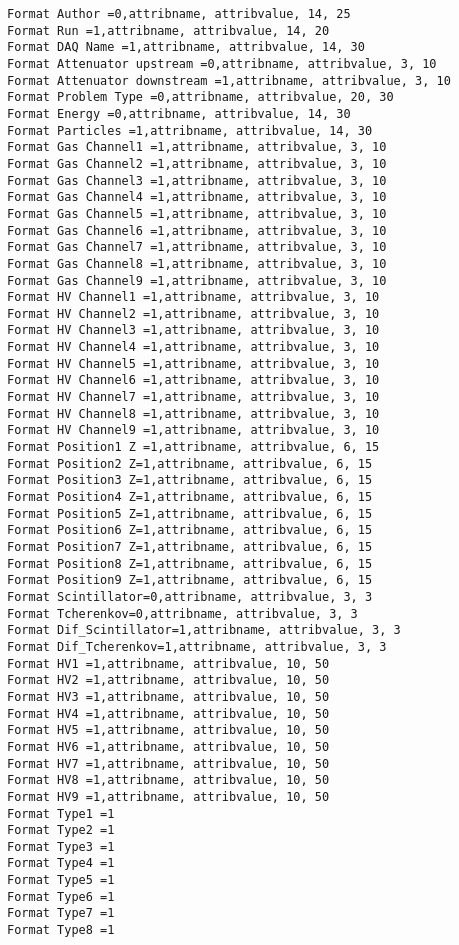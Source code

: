 {\begin{lstlisting}[breaklines=true,basicstyle=\tiny,postbreak=\mbox{\textcolor{red}{$\hookrightarrow$}\space},]
Format Author =0,attribname, attribvalue, 14, 25
Format Run =1,attribname, attribvalue, 14, 20
Format DAQ Name =1,attribname, attribvalue, 14, 30
Format Attenuator upstream =0,attribname, attribvalue, 3, 10
Format Attenuator downstream =1,attribname, attribvalue, 3, 10
Format Problem Type =0,attribname, attribvalue, 20, 30
Format Energy =0,attribname, attribvalue, 14, 30
Format Particles =1,attribname, attribvalue, 14, 30
Format Gas Channel1 =1,attribname, attribvalue, 3, 10
Format Gas Channel2 =1,attribname, attribvalue, 3, 10
Format Gas Channel3 =1,attribname, attribvalue, 3, 10
Format Gas Channel4 =1,attribname, attribvalue, 3, 10
Format Gas Channel5 =1,attribname, attribvalue, 3, 10
Format Gas Channel6 =1,attribname, attribvalue, 3, 10
Format Gas Channel7 =1,attribname, attribvalue, 3, 10
Format Gas Channel8 =1,attribname, attribvalue, 3, 10
Format Gas Channel9 =1,attribname, attribvalue, 3, 10
Format HV Channel1 =1,attribname, attribvalue, 3, 10
Format HV Channel2 =1,attribname, attribvalue, 3, 10
Format HV Channel3 =1,attribname, attribvalue, 3, 10
Format HV Channel4 =1,attribname, attribvalue, 3, 10
Format HV Channel5 =1,attribname, attribvalue, 3, 10
Format HV Channel6 =1,attribname, attribvalue, 3, 10
Format HV Channel7 =1,attribname, attribvalue, 3, 10
Format HV Channel8 =1,attribname, attribvalue, 3, 10
Format HV Channel9 =1,attribname, attribvalue, 3, 10
Format Position1 Z =1,attribname, attribvalue, 6, 15
Format Position2 Z=1,attribname, attribvalue, 6, 15
Format Position3 Z=1,attribname, attribvalue, 6, 15
Format Position4 Z=1,attribname, attribvalue, 6, 15
Format Position5 Z=1,attribname, attribvalue, 6, 15
Format Position6 Z=1,attribname, attribvalue, 6, 15
Format Position7 Z=1,attribname, attribvalue, 6, 15
Format Position8 Z=1,attribname, attribvalue, 6, 15
Format Position9 Z=1,attribname, attribvalue, 6, 15
Format Scintillator=0,attribname, attribvalue, 3, 3
Format Tcherenkov=0,attribname, attribvalue, 3, 3
Format Dif_Scintillator=1,attribname, attribvalue, 3, 3
Format Dif_Tcherenkov=1,attribname, attribvalue, 3, 3
Format HV1 =1,attribname, attribvalue, 10, 50
Format HV2 =1,attribname, attribvalue, 10, 50
Format HV3 =1,attribname, attribvalue, 10, 50
Format HV4 =1,attribname, attribvalue, 10, 50
Format HV5 =1,attribname, attribvalue, 10, 50
Format HV6 =1,attribname, attribvalue, 10, 50
Format HV7 =1,attribname, attribvalue, 10, 50
Format HV8 =1,attribname, attribvalue, 10, 50
Format HV9 =1,attribname, attribvalue, 10, 50
Format Type1 =1
Format Type2 =1
Format Type3 =1
Format Type4 =1
Format Type5 =1
Format Type6 =1
Format Type7 =1
Format Type8 =1

\end{lstlisting}}
